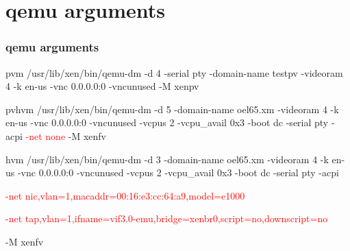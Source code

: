 \documentclass[aspectratio=169]{beamer}
\begin{document}
\section{qemu arguments}
\begin{frame}
\frametitle{qemu arguments}
\begin{block}{pvm}
/usr/lib/xen/bin/qemu-dm -d 4 -serial pty -domain-name testpv -videoram 4 -k en-us -vnc 0.0.0.0:0 -vncunused -M xenpv
\end{block}
\begin{block}{pvhvm}
/usr/lib/xen/bin/qemu-dm -d 5 -domain-name oel65.xm -videoram 4 -k en-us -vnc 0.0.0.0:0 -vncunused -vcpus 2 -vcpu\_avail 0x3 -boot dc -serial pty -acpi \textcolor{red}{-net none} -M xenfv
\end{block}
\begin{block}{hvm}
/usr/lib/xen/bin/qemu-dm -d 3 -domain-name oel65.xm -videoram 4 -k en-us -vnc 0.0.0.0:0 -vncunused -vcpus 2 -vcpu\_avail 0x3 -boot dc -serial pty -acpi

\textcolor{red}{-net nic,vlan=1,macaddr=00:16:e3:cc:64:a9,model=e1000}

\textcolor{red}{-net tap,vlan=1,ifname=vif3.0-emu,bridge=xenbr0,script=no,downscript=no}

-M xenfv
\end{block}
\end{frame}

\end{document}
